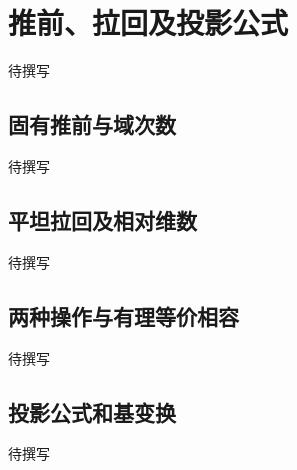 
% 
% 

\section{推前、拉回及投影公式}
\label{g5:sec:2702}

待撰写

\subsection{固有推前与域次数}
\label{g5:subsec:2702:01}
待撰写

\subsection{平坦拉回及相对维数}
\label{g5:subsec:2702:02}
待撰写

\subsection{两种操作与有理等价相容}
\label{g5:subsec:2702:03}
待撰写

\subsection{投影公式和基变换}
\label{g5:subsec:2702:04}
待撰写
